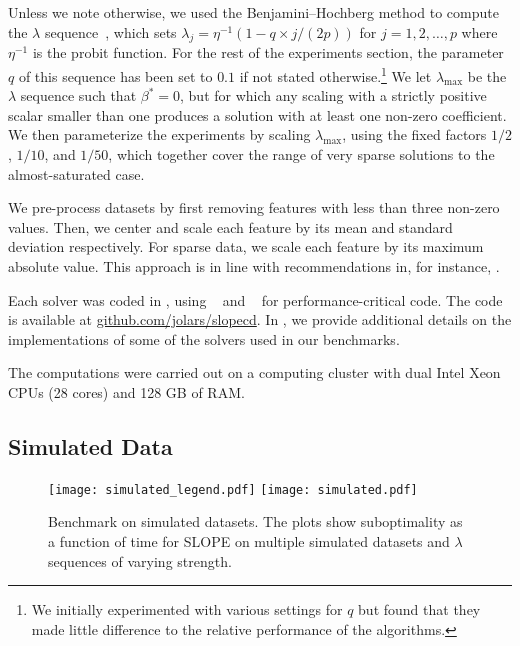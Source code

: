 Unless we note otherwise, we used the Benjamini--Hochberg method to compute the \(\lambda\) sequence~\parencite{bogdan2015},
which sets $\lambda_j = \eta^{-1}(1 - q\times j / (2p))$ for $j=1, 2, \hdots, p$ where $\eta^{-1}$ is the probit function.
For the rest of the experiments section, the parameter $q$ of this sequence has been set to $0.1$ if not stated otherwise.\footnote{We initially experimented with various settings for \(q\) but found that they made little difference to the relative performance of the algorithms.}
We let \(\lambda_\text{max}\) be the \(\lambda\) sequence such that \(\beta^* = 0\), but for which any scaling with a strictly positive scalar smaller than one produces a solution with at least one non-zero coefficient.
We then parameterize the experiments by scaling \(\lambda_\text{max}\), using the fixed factors \(1/2\), \(1/10\), and \(1/50\), which together cover the range of very sparse solutions to the almost-saturated case.

We pre-process datasets by first removing features with less than three non-zero values.
Then, we center and scale each feature by its mean and standard deviation respectively.
For sparse data, we scale each feature by its maximum absolute value.
This approach is in line with recommendations in, for instance, \textcite{pedregosa2022}.

Each solver was coded in , using ~\parencite{harris2020} and ~\parencite{lam2015} for performance-critical code.
The code is available at \href{https://github.com/jolars/slopecd}{\url{github.com/jolars/slopecd}}.
In , we provide additional details on the implementations of some of the solvers used in our benchmarks.

The computations were carried out on a computing cluster with dual Intel Xeon CPUs (28 cores) and 128 GB of RAM.

\subsection{Simulated Data}
\label{sec:experiments-simulated-data}

\begin{figure*}[!t]
  \centering
  \texttt{[image: simulated\_legend.pdf]}
  \texttt{[image: simulated.pdf]} \caption{Benchmark on simulated datasets. The plots show suboptimality as a function of time for SLOPE on multiple simulated datasets and $\lambda$ sequences of varying strength.}
  \label{fig:simulated}
\end{figure*}

